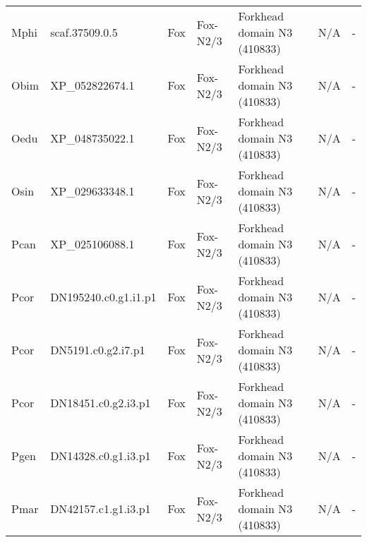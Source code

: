 \documentclass[../main.tex]{subfiles}
\begin{document}
\begin{landscape}
\begin{longtable}{lllllll}
		Mphi           & scaf.37509.0.5        & Fox            & Fox-N2/3            & Forkhead domain N3 (410833)                 & N/A                                                                    & -                    \\
		Obim           & XP\_052822674.1       & Fox            & Fox-N2/3            & Forkhead domain N3 (410833)                 & N/A                                                                    & -                    \\
		Oedu           & XP\_048735022.1       & Fox            & Fox-N2/3            & Forkhead domain N3 (410833)                 & N/A                                                                    & -                    \\
		Osin           & XP\_029633348.1       & Fox            & Fox-N2/3            & Forkhead domain N3 (410833)                 & N/A                                                                    & -                    \\
		Pcan           & XP\_025106088.1       & Fox            & Fox-N2/3            & Forkhead domain N3 (410833)                 & N/A                                                                    & -                    \\
		Pcor           & DN195240.c0.g1.i1.p1  & Fox            & Fox-N2/3            & Forkhead domain N3 (410833)                 & N/A                                                                    & -                    \\
		Pcor           & DN5191.c0.g2.i7.p1    & Fox            & Fox-N2/3            & Forkhead domain N3 (410833)                 & N/A                                                                    & -                    \\
		Pcor           & DN18451.c0.g2.i3.p1   & Fox            & Fox-N2/3            & Forkhead domain N3 (410833)                 & N/A                                                                    & -                    \\
		Pgen           & DN14328.c0.g1.i3.p1   & Fox            & Fox-N2/3            & Forkhead domain N3 (410833)                 & N/A                                                                    & -                    \\
		Pmar           & DN42157.c1.g1.i3.p1   & Fox            & Fox-N2/3            & Forkhead domain N3 (410833)                 & N/A                                                                    & -                    \\

\end{longtable}
\end{landscape}
\end{document}
